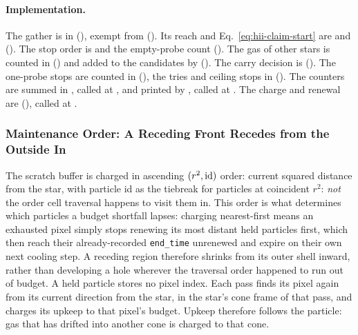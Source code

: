 \paragraph{Implementation.} The gather is in 
(), exempt from
(). Its reach and
Eq.~\eqref{eq:hii-claim-start} are  and
 ().
The stop order is  and the empty-probe count
(). The gas of other stars is
counted in 
() and added to the candidates by
 ().
The carry decision is
(). The one-probe stops are
counted in 
(), the tries and ceiling stops in
 (). The counters are summed in
, called at
, and printed by
, called at
. The charge and renewal are
(), called at
.

\subsubsection{Maintenance Order: A Receding Front Recedes from the
Outside In}

The scratch buffer is charged in ascending $(r^2,{\rm id})$
order: current squared distance from the star, with particle id as
the tiebreak for particles at coincident $r^2$: \emph{not} the order
cell traversal happens to visit them in. This order is what determines
which particles a budget shortfall lapses: charging nearest-first
means an exhausted pixel simply stops renewing its most distant held
particles first, which then reach their already-recorded
\texttt{end\_time} unrenewed and expire on their own next cooling
step. A receding region therefore shrinks from its outer shell inward,
rather than developing a hole wherever the traversal order happened to
run out of budget. A held particle stores no pixel index. Each pass
finds its pixel again from its current direction from the star, in the
star's cone frame of that pass, and charges its upkeep to that pixel's
budget. Upkeep therefore follows the particle: gas that has drifted into
another cone is charged to that cone.

